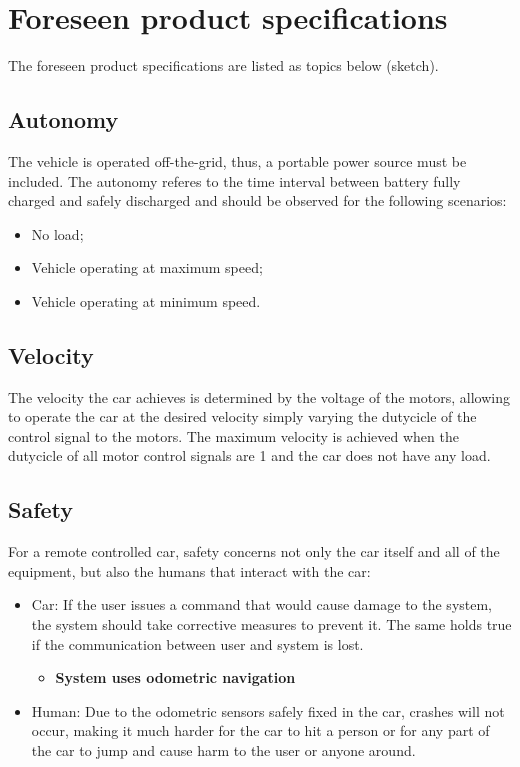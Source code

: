 \section{Foreseen product specifications}
\label{sec:org31f7574}
The foreseen product specifications are listed as topics below (sketch).

\subsection{Autonomy}
\label{sec:org7364ba5}
The vehicle is operated off-the-grid, thus, a portable power source must be included. The autonomy referes to the time interval between battery fully charged and safely discharged and should be observed for the following scenarios:
\begin{itemize}
\item No load;
\item Vehicle operating at maximum speed;
\item Vehicle operating at minimum speed.
\end{itemize}
\subsection{Velocity}
\label{sec:org08718bc}
The velocity the car achieves is determined by the voltage of the motors, allowing to operate the car at the desired velocity simply varying the dutycicle of the control signal to the motors. The maximum velocity is achieved when the dutycicle of all motor control signals are 1 and the car does not have any load. 
\subsection{Safety}
\label{sec:org83942c3}
For a remote controlled car, safety concerns not only the car itself and all of the equipment, but also the humans that interact with the car:
\begin{itemize}
\item Car: If the user issues a command that would cause damage to the system, the
system should take corrective measures to prevent it. The same holds true if
the communication between user and system is lost.
\begin{itemize}
\item \textbf{System uses odometric navigation}
\end{itemize}
\item Human: Due to the odometric sensors safely fixed in the car, crashes will not occur, making it much harder for the car to hit a person or for any part of the car to jump and cause harm to the user or anyone around.
\end{itemize}
